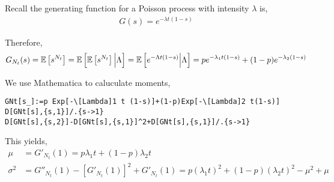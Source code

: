 \documentclass[10pt]{article}
\begin{document}
\begin{solution}[Solution]
Recall the generating function for a Poisson process with intensity \( \lambda \) is,
\begin{align*}
    G(s) = e^{-\lambda t(1-s)}
\end{align*}


Therefore,
\begin{align*}
    G_{N_t}(s) 
    = \mathbb{E} \left[ s^{N_t} \right] 
    = \mathbb{E} \left[ \mathbb{E} \left[ s^{N_t} \right] \Big| \Lambda \right] 
    = \mathbb{E}\left[ e^{-\Lambda t(1-s)} \Big| \Lambda \right]
    = pe^{-\lambda_1t(1-s)} + (1-p) e^{-\lambda_2(1-s)}
\end{align*}

We use Mathematica to caluculate moments,
\begin{lstlisting}
GNt[s_]:=p Exp[-\[Lambda]1 t (1-s)]+(1-p)Exp[-\[Lambda]2 t(1-s)]
D[GNt[s],{s,1}]/.{s->1}
D[GNt[s],{s,2}]-D[GNt[s],{s,1}]^2+D[GNt[s],{s,1}]/.{s->1}
\end{lstlisting}

This yields,
\begin{align*}
    \mu &= G'_{N_t}(1) = p \lambda_1 t  + (1-p) \lambda_2 t 
    \\\sigma^2 &= G''_{N_t}(1) - [G'_{N_t}(1)]^2 + G'_{N_t}(1) =  
    p (\lambda_1 t)^2 + (1-p)(\lambda_2 t)^2 - \mu^2 + \mu
\end{align*}
\end{solution}
\end{document}
